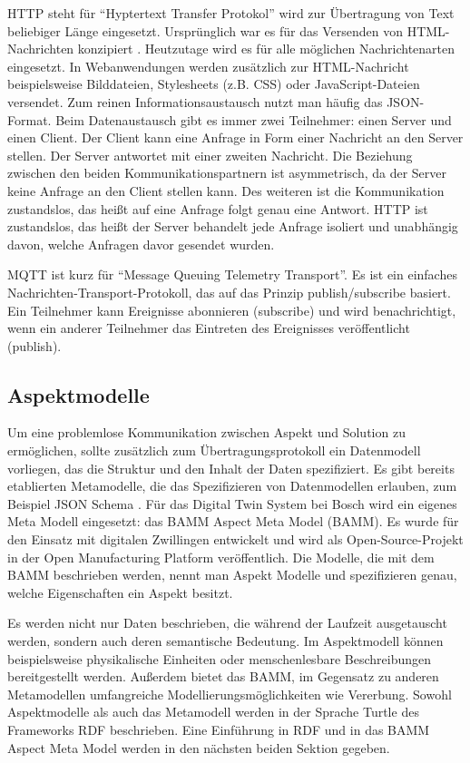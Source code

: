 HTTP steht für "`Hyptertext Transfer Protokol"' wird zur Übertragung von Text beliebiger Länge eingesetzt. Ursprünglich war es für das Versenden von HTML-Nachrichten konzipiert \cite{bernerslee1991http}. Heutzutage wird es für alle möglichen Nachrichtenarten eingesetzt. In Webanwendungen werden zusätzlich zur HTML-Nachricht beispielsweise Bilddateien, Stylesheets (z.B. CSS) oder JavaScript-Dateien versendet. Zum reinen Informationsaustausch nutzt man häufig das JSON-Format.
Beim Datenaustausch gibt es immer zwei Teilnehmer: einen Server und einen Client. Der Client kann eine Anfrage in Form einer Nachricht an den Server stellen. Der Server antwortet mit einer zweiten Nachricht. Die Beziehung zwischen den beiden Kommunikationspartnern ist asymmetrisch, da der Server keine Anfrage an den Client stellen kann. Des weiteren ist die Kommunikation zustandslos, das heißt auf eine Anfrage folgt genau eine Antwort. HTTP ist zustandslos, das heißt der Server behandelt jede Anfrage isoliert und unabhängig davon, welche Anfragen davor gesendet wurden. \cite[vgl.][]{fielding1999http}

MQTT ist kurz für "`Message Queuing Telemetry Transport"'. Es ist ein einfaches Nachrichten-Transport-Protokoll, das auf das Prinzip publish/subscribe basiert. Ein Teilnehmer kann Ereignisse abonnieren (subscribe) und wird benachrichtigt, wenn ein anderer Teilnehmer das Eintreten des Ereignisses veröffentlicht (publish). \cite[vgl.][]{banks2019mqtt}

\subsection{Aspektmodelle} \label{sec:aspektmodelle}

Um eine problemlose Kommunikation zwischen Aspekt und Solution zu ermöglichen, sollte zusätzlich zum Übertragungsprotokoll ein Datenmodell vorliegen, das die Struktur und den Inhalt der Daten spezifiziert. Es gibt bereits etablierten Metamodelle, die das Spezifizieren von Datenmodellen erlauben, zum Beispiel JSON Schema \cite[vgl.][]{wrigth2022jsonschema}. Für das Digital Twin System bei Bosch wird ein eigenes Meta Modell eingesetzt: das BAMM Aspect Meta Model (BAMM). Es wurde für den Einsatz mit digitalen Zwillingen entwickelt und wird als Open-Source-Projekt in der Open Manufacturing Platform veröffentlich. Die Modelle, die mit dem BAMM beschrieben werden, nennt man Aspekt Modelle und spezifizieren genau, welche Eigenschaften ein Aspekt besitzt. 

Es werden nicht nur Daten beschrieben, die während der Laufzeit ausgetauscht werden, sondern auch deren semantische Bedeutung. Im Aspektmodell können beispielsweise physikalische Einheiten oder menschenlesbare Beschreibungen bereitgestellt werden. Außerdem bietet das BAMM, im Gegensatz zu anderen Metamodellen umfangreiche Modellierungsmöglichkeiten wie Vererbung. Sowohl Aspektmodelle als auch das Metamodell werden in der Sprache Turtle des Frameworks RDF beschrieben. Eine Einführung in RDF und in das BAMM Aspect Meta Model werden in den nächsten beiden Sektion gegeben.


